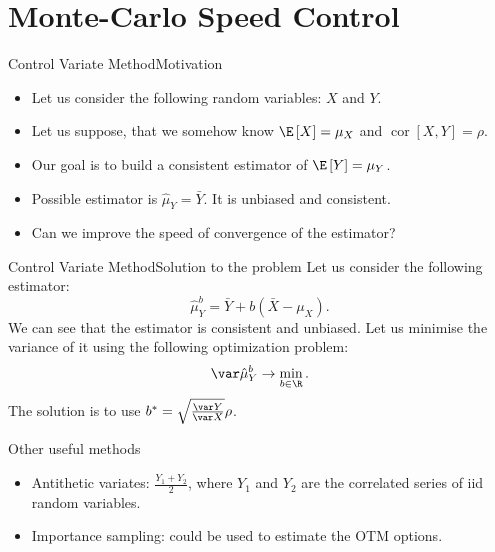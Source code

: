 \documentclass[aspectratio=169]{beamer}
\DeclareMathOperator*{\cor}{\ensuremath{\operatorname{cor}}}
\begin{document}
    \section{Monte-Carlo Speed Control}
        \begin{frame}{Control Variate Method}{Motivation}
            \begin{itemize}
                \item Let us consider the following random variables: $X$ and $Y$.
                \item Let us suppose, that we somehow know $\E\left[X\right] = \mu_X$ and $\cor\left[X, Y\right] = \rho$.
                \item Our goal is to build a consistent estimator of $\E\left[Y\right] = \mu_Y$.
                \item Possible estimator is $\hat\mu_Y = \bar Y$. It is unbiased and consistent.
                \item Can we improve the speed of convergence of the estimator?
            \end{itemize}
        \end{frame}

        \begin{frame}{Control Variate Method}{Solution to the problem}
            Let us consider the following estimator:
            \begin{equation}
                \hat\mu_Y^b = \bar Y + b \left(\bar X - \mu_X\right).
            \end{equation}
            We can see that the estimator is consistent and unbiased. Let us minimise the variance of it using the following optimization problem:
            \begin{equation}
                \var\hat\mu_Y^b \to \min_{b \in \R}.
            \end{equation}
            The solution is to use $b^* = \sqrt{\frac{\var Y}{\var X}}\rho$.
        \end{frame}

        \begin{frame}{Other useful methods}{}
            \begin{itemize}
                \item Antithetic variates: $\frac{Y_1 + Y_2}{2}$, where $Y_1$ and $Y_2$ are the correlated series of iid random variables.
                \item Importance sampling: could be used to estimate the OTM options.
            \end{itemize}
        \end{frame}
\end{document}
